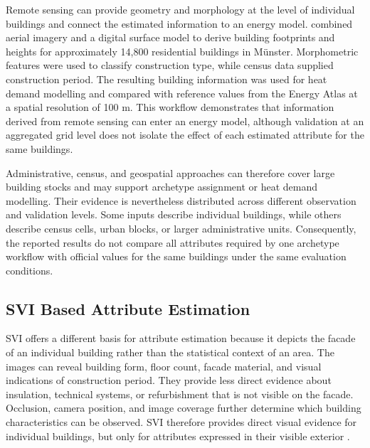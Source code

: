 Remote sensing can provide geometry and morphology at the level of individual buildings and connect the estimated information to an energy model. \textcite{wurm2021} combined aerial imagery and a digital surface model to derive building footprints and heights for approximately 14,800 residential buildings in M\"unster. Morphometric features were used to classify construction type, while census data supplied construction period. The resulting building information was used for heat demand modelling and compared with reference values from the Energy Atlas at a spatial resolution of 100 m. This workflow demonstrates that information derived from remote sensing can enter an energy model, although validation at an aggregated grid level does not isolate the effect of each estimated attribute for the same buildings.

Administrative, census, and geospatial approaches can therefore cover large building stocks and may support archetype assignment or heat demand modelling. Their evidence is nevertheless distributed across different observation and validation levels. Some inputs describe individual buildings, while others describe census cells, urban blocks, or larger administrative units. Consequently, the reported results do not compare all attributes required by one archetype workflow with official values for the same buildings under the same evaluation conditions.

\subsection{SVI Based Attribute Estimation}
\label{sec:street_view_attribute_estimation}

\Ac{SVI} offers a different basis for attribute estimation because it depicts the facade of an individual building rather than the statistical context of an area. The images can reveal building form, floor count, facade material, and visual indications of construction period. They provide less direct evidence about insulation, technical systems, or refurbishment that is not visible on the facade. Occlusion, camera position, and image coverage further determine which building characteristics can be observed. \Ac{SVI} therefore provides direct visual evidence for individual buildings, but only for attributes expressed in their visible exterior \parencite{liang2025,zeng2024}.

